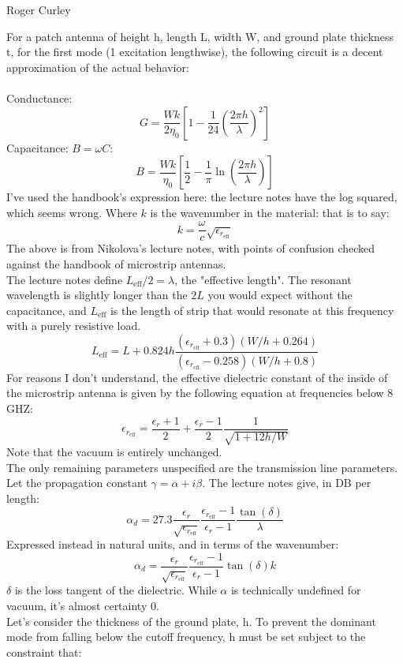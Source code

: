 \documentclass[final]{article}
\begin{document}
\begin{flushright}
Roger Curley
\end{flushright}
For a patch antenna of height h, length L, width W, and ground plate thickness t, for the first mode (1 excitation lengthwise), the following circuit is a decent approximation of the actual behavior:\\
\\
Conductance:
\[G=\frac{Wk}{2\eta_0} \left[1-\frac{1}{24}\left(\frac{2\pi h}{\lambda}\right)^2\right]\]
Capacitance: \(B=\omega C\):
\[B=\frac{Wk}{\eta_0} \left[\frac{1}{2}-\frac{1}{\pi} \ln\left(\frac{2\pi h}{\lambda}\right)\right]\]
I've used the handbook's expression here: the lecture notes have the log squared, which seems wrong.
Where \(k\) is the wavenumber in the material: that is to say:
\[k=\frac{\omega}{c}\sqrt{\epsilon_{r_\text{eff}}}\]
The above is from Nikolova's lecture notes, with points of confusion checked against the handbook of microstrip antennas.\\
The lecture notes define \(L_{\text{eff}}/2=\lambda\), the "effective length". The resonant wavelength is slightly longer than the \(2L\) you would expect without the capacitance, and \(L_{\text{eff}}\) is the length of strip that would resonate at this frequency with a purely resistive load.
\[L_{\text{eff}}=L+0.824h \frac{(\epsilon_{r_{\text{eff}}}+0.3)(W/h+0.264)}{(\epsilon_{r_{\text{eff}}}-0.258)(W/h+0.8)}\]
For reasons I don't understand, the effective dielectric constant of the inside of the microstrip antenna is given by the following equation at frequencies below 8 GHZ:
\[\epsilon_{r_{\text{eff}}}=\frac{\epsilon_r+1}{2}+\frac{\epsilon_r-1}{2}\frac{1}{\sqrt{1+12h/W}}\]
Note that the vacuum is entirely unchanged.\\
The only remaining parameters unspecified are the transmission line parameters. Let the propagation constant \(\gamma=\alpha+i\beta\). The lecture notes give, in DB per length:
\[\alpha_d=27.3 \frac{\epsilon_r}{\sqrt{\epsilon_{r_{\text{eff}}}}}\frac{\epsilon_{r_{\text{eff}}}-1}{\epsilon_r-1} \frac{\tan(\delta)}{\lambda}\]
Expressed instead in natural units, and in terms of the wavenumber:
\[\alpha_d= \frac{\epsilon_r}{\sqrt{\epsilon_{r_{\text{eff}}}}}\frac{\epsilon_{r_{\text{eff}}}-1}{\epsilon_r-1} \tan(\delta) k\]
\(\delta\) is the loss tangent of the dielectric. While \(\alpha\) is technically undefined for vacuum, it's almost certainty 0.\\
Let's consider the thickness of the ground plate, h. To prevent the dominant mode from falling below the cutoff frequency, h must be set subject to the constraint that:
\end{document}

